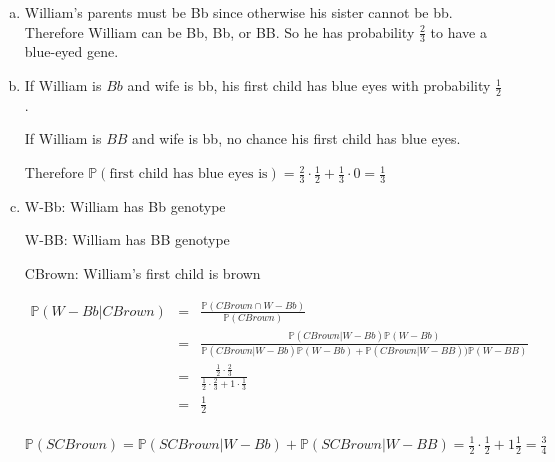 \documentclass[12pt]{article}
\begin{document}
\begin{enumerate}[(a)]
  \item William's parents must be Bb since otherwise his sister
	 cannot be bb.
	 Therefore William can be Bb, Bb, or BB.
	 So he has probability $\frac{2}{3}$ to have a blue-eyed gene.
  \item If William is $Bb$ and wife is bb, his first child has 
	 blue eyes with probability $\frac{1}{2}$. 

	 If William is $BB$ and wife is bb, no chance his first child has blue eyes.

	 Therefore $\mathbb{P}(\text{first child has blue eyes is})
	 = \frac{2}{3} \cdot \frac{1}{2} + \frac{1}{3} \cdot 0 = \frac{1}{3}$
  \item W-Bb: William has Bb genotype

	 W-BB: William has BB genotype

	 CBrown: William's first child is brown

	 \begin{eqnarray*}
	   \mathbb{P}(W-Bb|CBrown)
	 	&=& \frac{\mathbb{P}(CBrown \cap W-Bb)}{\mathbb{P}(CBrown)} \\
	 	&=& \frac{\mathbb{P}(CBrown|W-Bb)\mathbb{P}(W-Bb)}
			{\mathbb{P}(CBrown|W-Bb)\mathbb{P}(W-Bb)
			+\mathbb{P}(CBrown|W-BB))\mathbb{P}(W-BB)} \\
	 	&=& \frac{\frac{1}{2} \cdot \frac{2}{3}} 
			{\frac{1}{2}\cdot \frac{2}{3}+ 1\cdot\frac{1}{3}} \\
		&=& \frac{1}{2}\\
	 \end{eqnarray*}

	 $\mathbb{P}(SCBrown) = \mathbb{P}(SCBrown|W-Bb)+\mathbb{P}(SCBrown|W-BB)
				= \frac{1}{2} \cdot \frac{1}{2} + 1\frac{1}{2}
				= \frac{3}{4}$
\end{enumerate}
\end{document}
